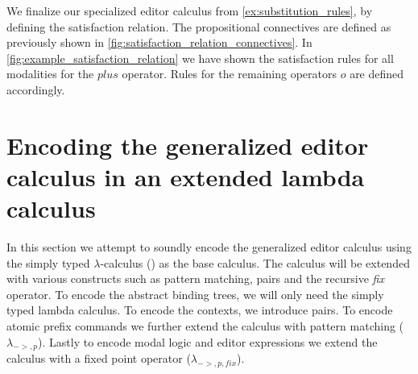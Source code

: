 \documentclass[sigplan,screen]{acmart}
\begin{document}
\begin{example}\label{ex:modal_logic}
    We finalize our specialized editor calculus from \cref{ex:substitution_rules}, by defining the satisfaction relation. The propositional connectives are defined as previously shown in \cref{fig:satisfaction_relation_connectives}. In \cref{fig:example_satisfaction_relation} we have shown the satisfaction rules for all modalities for the $plus$ operator. Rules for the remaining operators $o$ are defined accordingly.
\end{example}

\section{Encoding the generalized editor calculus in an extended lambda calculus} \label{sec:encoding}
In this section we attempt to soundly encode the generalized editor calculus using the simply typed $\lambda$-calculus (\stlc) as the base calculus. The calculus will be extended with various constructs such as pattern matching, pairs and the recursive \textit{fix} operator. To encode the abstract binding trees, we will only need the simply typed lambda calculus. To encode the contexts, we introduce pairs. To encode atomic prefix commands we further extend the calculus with pattern matching ($\lambda_{->,p}$). Lastly to encode modal logic and editor expressions we extend the calculus with a fixed point operator ($\lambda_{->,p,fix}$). 

\end{document}
